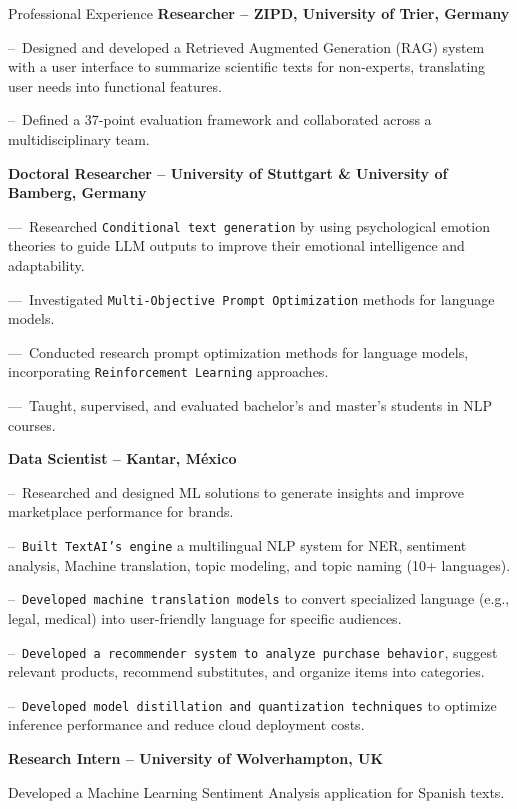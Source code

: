 \begin{rubric}{Professional Experience}
\entry*[02.2025 -- Present]%
\textbf{Researcher -- ZIPD, University of Trier, Germany}

--~Designed and developed a Retrieved Augmented Generation (RAG) system with a user interface to summarize scientific texts for non-experts, translating user needs into functional features.\par\par
--~Defined a 37-point evaluation framework and collaborated across a multidisciplinary team.\par\par

\entry*[04.2022 -- 01.2025]%
	\textbf{Doctoral Researcher -- University of Stuttgart \& University of Bamberg, Germany}
	
---~Researched \texttt{Conditional text generation} by using psychological emotion theories to guide LLM outputs to improve their emotional intelligence and adaptability.\par\par

 ---~Investigated \texttt{Multi-Objective Prompt Optimization} methods for language models.\par\par

 ---~Conducted research prompt optimization methods for language models, incorporating \texttt{Reinforcement Learning} approaches.\par\par
 
---~Taught, supervised, and evaluated bachelor’s and master’s students in NLP courses.\par\par

\entry*[06.2018 -- 09.2021]%
	\textbf{Data Scientist -- Kantar, México}
	
	--~Researched and designed ML solutions to generate insights and improve marketplace performance for brands.\par\par
%
--~\texttt{Built TextAI’s engine} a multilingual NLP system for NER, sentiment analysis, Machine translation, topic modeling, and topic naming (10+ languages).\par

--~\texttt{Developed machine translation models} to convert specialized language (e.g., legal, medical) into user-friendly language for specific audiences.

--~\texttt{Developed a recommender system to analyze purchase behavior}, suggest relevant products, recommend substitutes, and organize items into categories.\par
--~\texttt{Developed model distillation and quantization techniques} to optimize inference performance and reduce cloud deployment costs.

%
%
\entry*[02.2017 -- 08.2017]%
	\textbf{Research Intern -- University of Wolverhampton, UK}
 
 Developed a Machine Learning Sentiment Analysis application for Spanish texts.
%
\end{rubric}